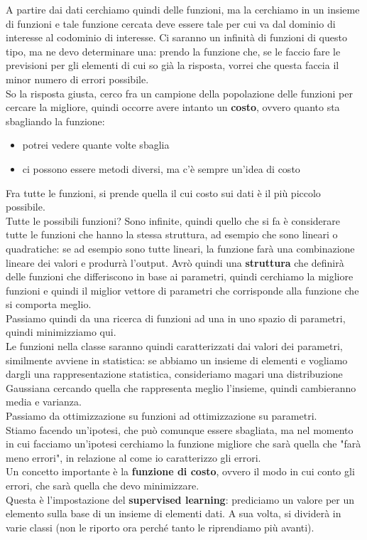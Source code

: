 \documentclass[12pt, oneside]{extbook}
\begin{document}
A partire dai dati cerchiamo quindi delle funzioni, ma la cerchiamo in un insieme di funzioni e tale funzione cercata deve essere tale per cui va dal dominio di interesse al codominio di interesse. Ci saranno un infinità di funzioni di questo tipo, ma ne devo determinare una: prendo la funzione che, se le faccio fare le previsioni per gli elementi di cui so già la risposta, vorrei che questa faccia il minor numero di errori possibile.\\So la risposta giusta, cerco fra un campione della popolazione delle funzioni per cercare la migliore, quindi occorre avere intanto un \textbf{costo}, ovvero quanto sta sbagliando la funzione:
\begin{itemize}
	\item potrei vedere quante volte sbaglia
	\item ci possono essere metodi diversi, ma c'è sempre un'idea di costo
\end{itemize}
Fra tutte le funzioni, si prende quella il cui costo sui dati è il più piccolo possibile.\\Tutte le possibili funzioni? Sono infinite, quindi quello che si fa è considerare tutte le funzioni che hanno la stessa struttura, ad esempio che sono lineari o quadratiche: se ad esempio sono tutte lineari, la funzione farà una combinazione lineare dei valori e produrrà l'output. Avrò quindi una \textbf{struttura} che definirà delle funzioni che differiscono in base ai parametri, quindi cerchiamo la migliore funzioni e quindi il miglior vettore di parametri che corrisponde alla funzione che si comporta meglio.\\Passiamo quindi da una ricerca di funzioni ad una in uno spazio di parametri, quindi minimizziamo qui.\\Le funzioni nella classe saranno quindi caratterizzati dai valori dei parametri, similmente avviene in statistica: se abbiamo un insieme di elementi e vogliamo dargli una rappresentazione statistica, consideriamo magari una distribuzione Gaussiana cercando quella che rappresenta meglio l'insieme, quindi cambieranno media e varianza.\\Passiamo da ottimizzazione su funzioni ad ottimizzazione su parametri.\\Stiamo facendo un'ipotesi, che può comunque essere sbagliata, ma nel momento in cui facciamo un'ipotesi cerchiamo la funzione migliore che sarà quella che "farà meno errori", in relazione al come io caratterizzo gli errori.\\Un concetto importante è la \textbf{funzione di costo}, ovvero il modo in cui conto gli errori, che sarà quella che devo minimizzare.\\Questa è l'impostazione del \textbf{supervised learning}: prediciamo un valore per un elemento sulla base di un insieme di elementi dati. A sua volta, si dividerà in varie classi (non le riporto ora perché tanto le riprendiamo più avanti).
	
\end{document}
